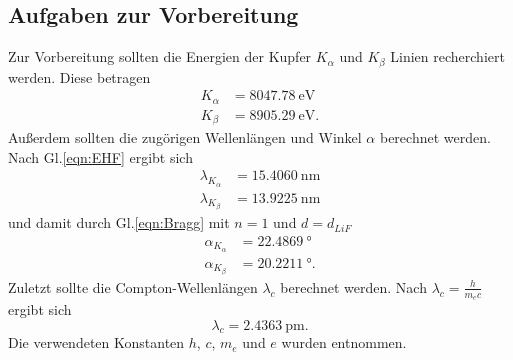 \subsection{Aufgaben zur Vorbereitung}
Zur Vorbereitung sollten die Energien der Kupfer $K_\alpha$ und $K_\beta$ Linien recherchiert werden.\cite{Copper}
Diese betragen
\begin{align*}
    K_\alpha &= \SI{8047,78}{\electronvolt}\\
    K_\beta &= \SI{8905,29}{\electronvolt}. 
\end{align*}
Außerdem sollten die zugörigen Wellenlängen und Winkel $\alpha$ berechnet werden.
Nach Gl.\eqref{eqn:EHF} ergibt sich
\begin{align*}
    \lambda_{K_\alpha} &= \SI{15,4060}{\nano\meter}\\
    \lambda_{K_\beta} &= \SI{13,9225}{\nano\meter}
\end{align*}
und damit durch Gl.\eqref{eqn:Bragg} mit $n=1$ und $d = d_{LiF}$
\begin{align*}
    \alpha_{K_\alpha} &= \SI{22,4869}{\degree}\\
    \alpha_{K_\beta} &= \SI{20,2211}{\degree} .
\end{align*}
Zuletzt sollte die Compton-Wellenlängen $\lambda_c$ berechnet werden. Nach $\lambda_c = \frac{h}{m_ec}$ ergibt sich
\begin{equation*}
    \lambda_c = \SI{2,4363}{\pico\meter}.
\end{equation*}
Die verwendeten Konstanten $h$, $c$, $m_e$ und $e$ wurden \cite{Gerth} entnommen.
